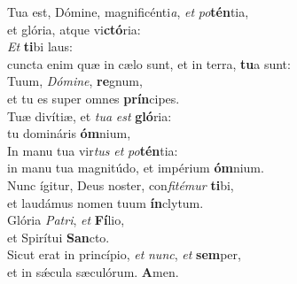 \evenverse Tua est, Dómine, magnificénti\textit{a}, \textit{et} \textit{po}\textbf{tén}tia,~\*\\
\evenverse et glória, atque vi\textbf{ctó}ria:\\
\oddverse \textit{Et} \textbf{ti}bi laus:~\*\\
\oddverse cuncta enim quæ in cælo sunt, et in terra, \textbf{tu}a sunt:\\
\evenverse Tuum, \textit{Dó}\textit{mi}\textit{ne}, \textbf{re}gnum,~\*\\
\evenverse et tu es super omnes \textbf{prín}cipes.\\
\oddverse Tuæ divítiæ, et \textit{tu}\textit{a} \textit{est} \textbf{gló}ria:~\*\\
\oddverse tu domináris \textbf{óm}nium,\\
\evenverse In manu tua vir\textit{tus} \textit{et} \textit{po}\textbf{tén}tia:~\*\\
\evenverse in manu tua magnitúdo, et impérium \textbf{óm}nium.\\
\oddverse Nunc ígitur, Deus noster, con\textit{fi}\textit{té}\textit{mur} \textbf{ti}bi,~\*\\
\oddverse et laudámus nomen tuum \textbf{ín}clytum.\\
\evenverse Glória \textit{Pa}\textit{tri}, \textit{et} \textbf{Fí}lio,~\*\\
\evenverse et Spirítui \textbf{San}cto.\\
\oddverse Sicut erat in princípio, \textit{et} \textit{nunc}, \textit{et} \textbf{sem}per,~\*\\
\oddverse et in sǽcula sæculórum. \textbf{A}men.\\
